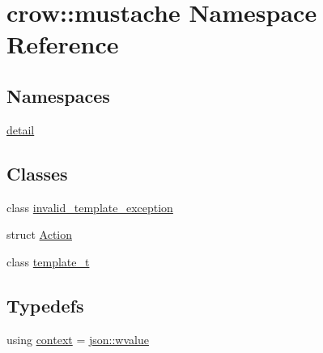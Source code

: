 \hypertarget{namespacecrow_1_1mustache}{\section{crow\-:\-:mustache Namespace Reference}
\label{namespacecrow_1_1mustache}
}
\subsection*{Namespaces}
\begin{DoxyCompactItemize}
\item 
\hyperlink{namespacecrow_1_1mustache_1_1detail}{detail}
\end{DoxyCompactItemize}
\subsection*{Classes}
\begin{DoxyCompactItemize}
\item 
class \hyperlink{classcrow_1_1mustache_1_1invalid__template__exception}{invalid\-\_\-template\-\_\-exception}
\item 
struct \hyperlink{structcrow_1_1mustache_1_1_action}{Action}
\item 
class \hyperlink{classcrow_1_1mustache_1_1template__t}{template\-\_\-t}
\end{DoxyCompactItemize}
\subsection*{Typedefs}
\begin{DoxyCompactItemize}
\item 
using \hyperlink{namespacecrow_1_1mustache_ae1f8ebbbcd4c41b97a2aebb247a123f9}{context} = \hyperlink{classcrow_1_1json_1_1wvalue}{json\-::wvalue}
\end{DoxyCompactItemize}
